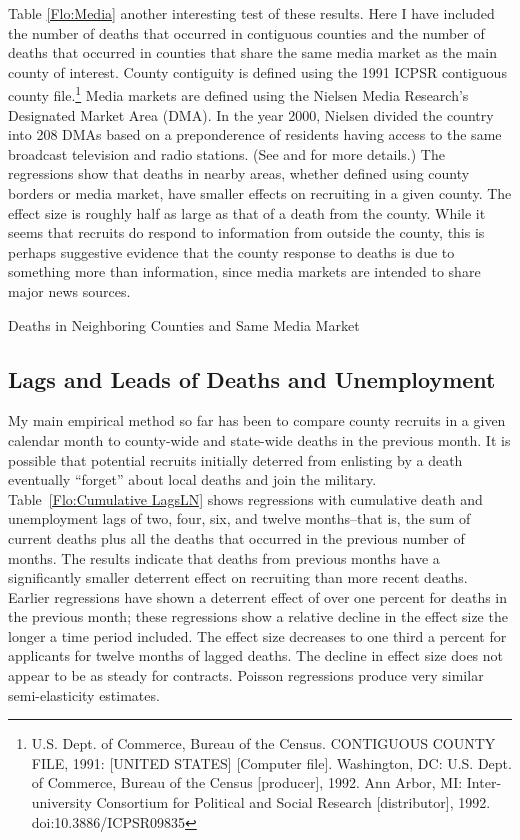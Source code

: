 \documentclass[12pt] {article}
\begin{document}
Table \ref{Flo:Media} another interesting test of these results. Here I have included the number of deaths that occurred in contiguous counties and the number of deaths that occurred in counties that share
the same media market as the main county of interest. County contiguity
is defined using the 1991 ICPSR contiguous county file.\footnote{U.S. Dept. of Commerce, Bureau of the Census. CONTIGUOUS COUNTY FILE,
1991: {[}UNITED STATES{]} {[}Computer file{]}. Washington, DC: U.S.
Dept. of Commerce, Bureau of the Census {[}producer{]}, 1992. Ann
Arbor, MI: Inter- university Consortium for Political and Social Research
{[}distributor{]}, 1992. doi:10.3886/ICPSR09835 
} Media markets are defined using the Nielsen Media Research's Designated
Market Area (DMA). In the year 2000, Nielsen divided the country into 208 DMAs based on a preponderence of residents having access to the same broadcast television and radio stations.   (See \cite{DMAsource1} and \cite{DMAsource2} for more details.) The regressions show that deaths in nearby areas, whether defined using county borders or media market, have smaller effects on recruiting in a given county. The effect size is roughly half as large as that of a death from the county. While it seems that recruits do respond to information from outside the county, this is perhaps suggestive evidence that the county response to deaths is due to something more than information, since media markets are intended to share major news sources. 

\begin{table}
\caption{Deaths in Neighboring Counties and Same Media Market}
\label{Flo:Media}
\scalebox{0.65}{
}
\end{table}

\subsection{Lags and Leads of Deaths and Unemployment\label{sub:Lags}}
My main empirical method so far has been to compare county recruits
in a given calendar month to county-wide and state-wide deaths in
the previous month. It is possible that potential recruits initially
deterred from enlisting by a death eventually {}``forget'' about
local deaths and join the military. Table~\ref{Flo:Cumulative LagsLN}
shows regressions with cumulative death and unemployment lags
of two, four, six, and twelve months--that is, the sum of current
deaths plus all the deaths that occurred in the previous number of
months. The results indicate that deaths from previous months have a significantly smaller deterrent effect on recruiting than more recent deaths. Earlier regressions have shown a deterrent effect of over one percent for deaths in the previous month; these
regressions show a relative decline in the effect size the longer a time period included. The effect size decreases to one third a percent for applicants for twelve months of lagged deaths. The decline in effect size does not appear to be as steady for contracts. Poisson regressions produce very similar semi-elasticity
estimates.
\end{document}
